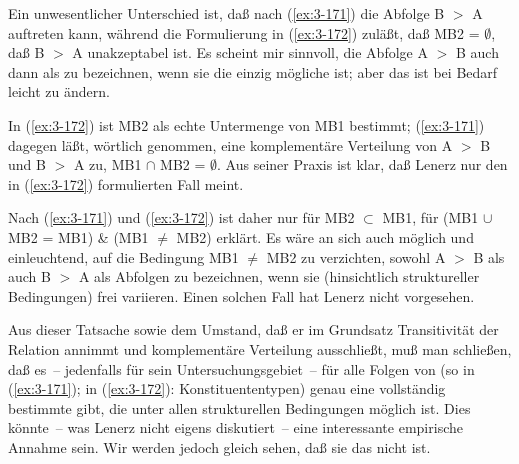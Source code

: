 \documentclass[output=paper]{langsci/langscibook}
\begin{document}
Ein unwesentlicher Unterschied ist, daß nach (\ref{ex:3-171}) die Abfolge B $>$ A
auftreten kann, während die Formulierung in (\ref{ex:3-172}) zuläßt, daß MB2 = $\emptyset$, \dash daß B $>$ A unakzeptabel ist. Es scheint mir sinnvoll, die Abfolge A $>$ B auch dann als  zu bezeichnen, wenn sie die einzig mögliche ist; aber das ist bei Bedarf leicht zu ändern.

In (\ref{ex:3-172}) ist MB2 als echte Untermenge von MB1 bestimmt; (\ref{ex:3-171}) dagegen läßt, wörtlich genommen, eine komplementäre Verteilung von A $>$ B und B $>$ A zu, \dash MB1 $\cap$ MB2 = $\emptyset$. Aus seiner Praxis ist klar, daß Lenerz nur den in (\ref{ex:3-172}) formulierten Fall meint.

Nach (\ref{ex:3-171}) und (\ref{ex:3-172}) ist daher  nur für MB2 $\subset$ MB1, \dash für (MB1 $\cup$ MB2 = MB1) \& (MB1 $\neq$ MB2) erklärt. Es wäre an sich auch möglich und einleuchtend, auf die Bedingung MB1 $\neq$ MB2 zu verzichten, \dash sowohl A $>$ B als auch B $>$ A als  Abfolgen zu bezeichnen, wenn sie (hinsichtlich struktureller Bedingungen) frei variieren. Einen solchen Fall hat Lenerz nicht vorgesehen.

Aus dieser Tatsache sowie dem Umstand, daß er im Grundsatz Transitivität der Relation  annimmt und komplementäre Verteilung ausschließt, muß man schließen, daß es~-- jedenfalls für sein Untersuchungsgebiet~-- für alle Folgen von
 (so in (\ref{ex:3-171}); in (\ref{ex:3-172}): Konstituententypen) genau eine
vollständig bestimmte  gibt, die unter allen strukturellen Bedingungen möglich ist. Dies könnte~-- was Lenerz
nicht eigens diskutiert~-- eine interessante empirische Annahme sein. Wir
werden jedoch gleich sehen, daß sie das nicht ist.
\end{document}
